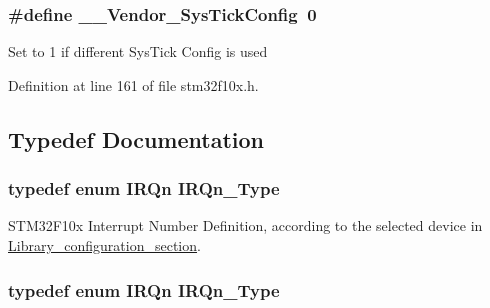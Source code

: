 \subsubsection[{\texorpdfstring{\+\_\+\+\_\+\+Vendor\+\_\+\+Sys\+Tick\+Config}{__Vendor_SysTickConfig}}]{\setlength{\rightskip}{0pt plus 5cm}\#define \+\_\+\+\_\+\+Vendor\+\_\+\+Sys\+Tick\+Config~0}\hypertarget{group___configuration__section__for___c_m_s_i_s_gab58771b4ec03f9bdddc84770f7c95c68}{}\label{group___configuration__section__for___c_m_s_i_s_gab58771b4ec03f9bdddc84770f7c95c68}
Set to 1 if different Sys\+Tick Config is used 

Definition at line 161 of file stm32f10x.\+h.



\subsection{Typedef Documentation}
\subsubsection[{\texorpdfstring{I\+R\+Qn\+\_\+\+Type}{IRQn_Type}}]{\setlength{\rightskip}{0pt plus 5cm}typedef enum {\bf I\+R\+Qn}  {\bf I\+R\+Qn\+\_\+\+Type}}\hypertarget{group___configuration__section__for___c_m_s_i_s_gac3af4a32370fb28c4ade8bf2add80251}{}\label{group___configuration__section__for___c_m_s_i_s_gac3af4a32370fb28c4ade8bf2add80251}


S\+T\+M32\+F10x Interrupt Number Definition, according to the selected device in \hyperlink{group___library__configuration__section}{Library\+\_\+configuration\+\_\+section}. 

\subsubsection[{\texorpdfstring{I\+R\+Qn\+\_\+\+Type}{IRQn_Type}}]{\setlength{\rightskip}{0pt plus 5cm}typedef enum {\bf I\+R\+Qn}  {\bf I\+R\+Qn\+\_\+\+Type}}\hypertarget{group___configuration__section__for___c_m_s_i_s_gac3af4a32370fb28c4ade8bf2add80251}{}\label{group___configuration__section__for___c_m_s_i_s_gac3af4a32370fb28c4ade8bf2add80251}


